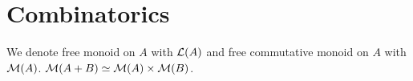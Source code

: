 \section{Combinatorics}
\label{sec:combinatorics}

We denote free monoid on $A$ with $\mathcal{L}(A)$ and free commutative monoid on $A$ with $\mathcal{M}(A)$.
$\mathcal{M}(A + B) \mathrel{\simeq} \mathcal{M}(A) \times \mathcal{M}(B)$.


